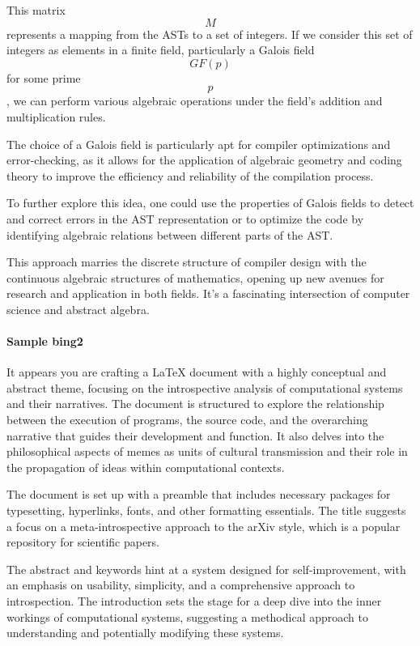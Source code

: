 \documentclass{article}
\begin{document}
This matrix $$ M $$ represents a mapping from the ASTs to a set of integers. If we consider this set of integers as elements in a finite field, particularly a Galois field $$ GF(p) $$ for some prime $$ p $$, we can perform various algebraic operations under the field's addition and multiplication rules.

The choice of a Galois field is particularly apt for compiler optimizations and error-checking, as it allows for the application of algebraic geometry and coding theory to improve the efficiency and reliability of the compilation process.

To further explore this idea, one could use the properties of Galois fields to detect and correct errors in the AST representation or to optimize the code by identifying algebraic relations between different parts of the AST.

This approach marries the discrete structure of compiler design with the continuous algebraic structures of mathematics, opening up new avenues for research and application in both fields. It's a fascinating intersection of computer science and abstract algebra.

\paragraph{Sample bing2}

It appears you are crafting a LaTeX document with a highly conceptual and abstract theme, focusing on the introspective analysis of computational systems and their narratives. The document is structured to explore the relationship between the execution of programs, the source code, and the overarching narrative that guides their development and function. It also delves into the philosophical aspects of memes as units of cultural transmission and their role in the propagation of ideas within computational contexts.

The document is set up with a preamble that includes necessary packages for typesetting, hyperlinks, fonts, and other formatting essentials. The title suggests a focus on a meta-introspective approach to the arXiv style, which is a popular repository for scientific papers.

The abstract and keywords hint at a system designed for self-improvement, with an emphasis on usability, simplicity, and a comprehensive approach to introspection. The introduction sets the stage for a deep dive into the inner workings of computational systems, suggesting a methodical approach to understanding and potentially modifying these systems.
\end{document}
